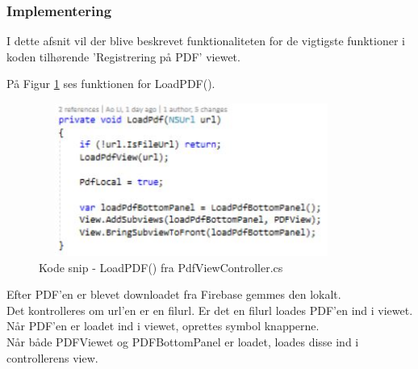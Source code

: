 \clearpage

\subsubsection{Implementering}
I dette afsnit vil der blive beskrevet funktionaliteten for de vigtigste funktioner i koden tilhørende 'Registrering på PDF' viewet.

På Figur \ref{fig:LoadPDF} ses funktionen for LoadPDF().
\begin{figure}[H] %
	\centering
	\includegraphics[height=5cm, width=10cm]{../ArkitekturDesign/Design/RegisterPDF/LoadPDF}
	\caption{Kode snip - LoadPDF() fra PdfViewController.cs}
	\label{fig:LoadPDF}
\end{figure}
Efter PDF'en er blevet downloadet fra Firebase gemmes den lokalt. \\
Det kontrolleres om url'en er en filurl. Er det en filurl loades PDF'en ind i viewet. \\
Når PDF'en er loadet ind i viewet, oprettes symbol knapperne. \\
Når både PDFViewet og PDFBottomPanel er loadet, loades disse ind i controllerens view.

\clearpage


